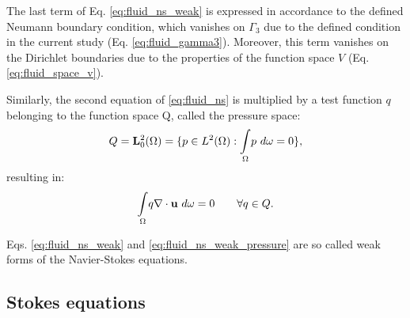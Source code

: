 \noindent The last term of Eq. \ref{eq:fluid_ns_weak} is expressed in accordance to the defined Neumann boundary condition, which vanishes on $\Gamma_3$ due to the defined condition in the current study (Eq. \ref{eq:fluid_gamma3}). Moreover, this term vanishes on the Dirichlet boundaries due to the properties of the function space $V$ (Eq. \ref{eq:fluid_space_v}).

Similarly, the second equation of \ref{eq:fluid_ns} is multiplied by a test function $q$ belonging to the function space Q, called the pressure space:
\begin{equation}
Q = {\bf L}^2_0(\Omega) = \lbrace p \in L^2(\Omega) : {\mathop{\int}_{\Omega}} p \ d\omega = 0\rbrace,
\end{equation}
resulting in:
\begin{equation} \label{eq:fluid_ns_weak_pressure}
{\mathop{\int}_{\Omega}} q \nabla\cdot{\bf u}\ d\omega = 0 \qquad \forall q \in Q.
\end{equation}

Eqs. \ref{eq:fluid_ns_weak} and \ref{eq:fluid_ns_weak_pressure} are so called weak forms of the Navier-Stokes equations.

\subsection{Stokes equations}

